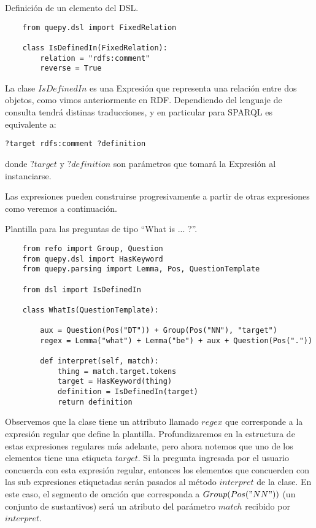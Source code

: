 \begin{example}Definición de un elemento del DSL.
    \begin{lstlisting}
    from quepy.dsl import FixedRelation

    class IsDefinedIn(FixedRelation):
        relation = "rdfs:comment"
        reverse = True
    \end{lstlisting}
\end{example}

La clase $IsDefinedIn$ es una Expresión que representa una relación entre dos objetos, como vimos anteriormente en RDF. Dependiendo del lenguaje de consulta tendrá distinas traducciones, y en particular para SPARQL es equivalente a:

\begin{lstlisting}
?target rdfs:comment ?definition
\end{lstlisting}

donde $?target$ y $?definition$ son parámetros que tomará la Expresión al instanciarse.

Las expresiones pueden construirse progresivamente a partir de otras expresiones como veremos a continuación.

\begin{example}\label{plantilla-quepy} Plantilla para las preguntas de tipo ``What is ... ?''.
    \begin{lstlisting}
    from refo import Group, Question
    from quepy.dsl import HasKeyword
    from quepy.parsing import Lemma, Pos, QuestionTemplate

    from dsl import IsDefinedIn

    class WhatIs(QuestionTemplate):

        aux = Question(Pos("DT")) + Group(Pos("NN"), "target")
        regex = Lemma("what") + Lemma("be") + aux + Question(Pos("."))

        def interpret(self, match):
            thing = match.target.tokens
            target = HasKeyword(thing)
            definition = IsDefinedIn(target)
            return definition
    \end{lstlisting}
\end{example}

Observemos que la clase tiene un attributo llamado $regex$ que corresponde a la expresión regular que define la plantilla. Profundizaremos en la estructura de estas expresiones regulares más adelante, pero ahora notemos que uno de los elementos tiene una etiqueta $target$. Si la pregunta ingresada por el usuario concuerda con esta expresión regular, entonces los elementos que concuerden con las sub expresiones etiquetadas serán pasados al método $interpret$ de la clase. En este caso, el segmento de oración que corresponda a $Group(Pos("NN"))$ (un conjunto de sustantivos) será un atributo del parámetro $match$ recibido por $interpret$.

